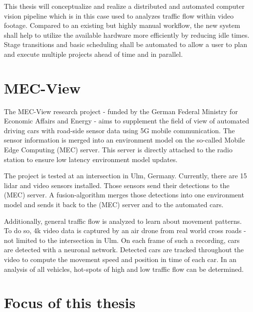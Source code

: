 This thesis will conceptualize and realize a distributed and automated computer vision pipeline which is in this case used to analyzes traffic flow within video footage.
Compared to an existing but highly manual workflow, the new system shall help to utilize the available hardware more efficiently by reducing idle times.
Stage transitions and basic scheduling shall be automated to allow a user to plan and execute multiple projects ahead of time and in parallel.



\newpage
\section{MEC-View}


The MEC-View research project\cite{mecview:main} - funded by the German Federal Ministry for Economic Affairs and Energy - aims to supplement the field of view of automated driving cars with road-side sensor data using 5G mobile communication. The sensor information is merged into an environment model on the so-called Mobile Edge Computing (MEC) server. This server is directly attached to the radio station to ensure low latency environment model updates.

The project is tested at an intersection in Ulm, Germany.
Currently, there are 15 lidar and video sensors installed.
Those sensors send their detections to the (MEC) server.
A fusion-algorithm merges those detections into one environment model and sends it back to the (MEC) server and to the automated cars.

Additionally, general traffic flow is analyzed to learn about movement patterns.
To do so, 4k video data is captured by an air drone from real world cross roads - not limited to the intersection in Ulm.
On each frame of such a recording, cars are detected with a neuronal network.
Detected cars are tracked throughout the video to compute the movement speed and position in time of each car.
In an analysis of all vehicles, hot-spots of high and low traffic flow can be determined.

\section{Focus of this thesis}

